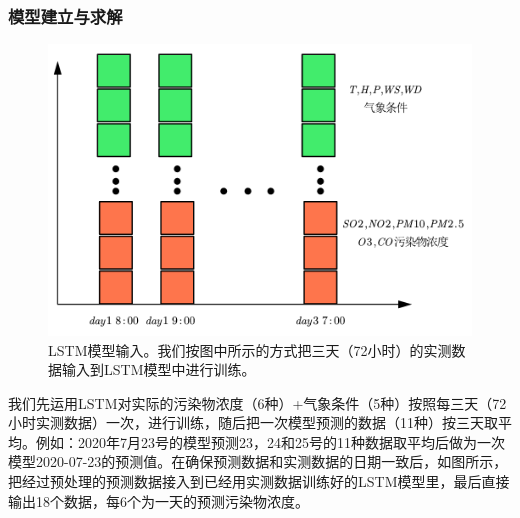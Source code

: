 \documentclass[bwprint]{gmcmthesis}
\numberwithin{figure}{section}
\begin{document}
\subsubsection{模型建立与求解}
\begin{figure}[!h]
	\centering
	\includegraphics[width=.7\textwidth]{LSTM_input.png}
	\caption{LSTM模型输入。我们按图中所示的方式把三天（72小时）的实测数据输入到LSTM模型中进行训练。}
	\label{LSTM-INPUT}
\end{figure}
我们先运用LSTM对实际的污染物浓度（6种）+气象条件（5种）按照每三天（72小时实测数据）一次，进行训练，随后把一次模型预测的数据（11种）按三天取平均。例如：2020年7月23号的模型预测23，24和25号的11种数据取平均后做为一次模型2020-07-23的预测值。在确保预测数据和实测数据的日期一致后，如图所示，把经过预处理的预测数据接入到已经用实测数据训练好的LSTM模型里，最后直接输出18个数据，每6个为一天的预测污染物浓度。
\end{document}
